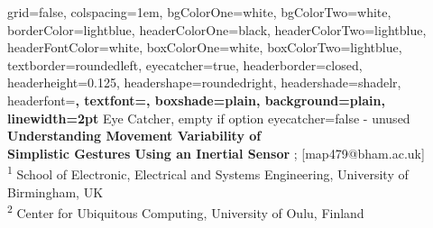 \documentclass[a0paper,portrait]{baposter}
\begin{document}







\begin{poster}%
  {
  grid=false,
  colspacing=1em,
  bgColorOne=white,
  bgColorTwo=white,
  borderColor=lightblue,
  headerColorOne=black,
  headerColorTwo=lightblue,
  headerFontColor=white,
  boxColorOne=white,
  boxColorTwo=lightblue,
  textborder=roundedleft,
  eyecatcher=true,
  headerborder=closed,
  headerheight=0.125\textheight,
  headershape=roundedright,
  headershade=shadelr,
  headerfont=\Large\bf\textsc, %
  textfont={\setlength{\parindent}{1.5em}},
  boxshade=plain,
  background=plain,
  linewidth=2pt
  }
{
	Eye Catcher, empty if option eyecatcher=false - unused
}
{\bf
  {Understanding Movement Variability of \\ Simplistic Gestures Using an Inertial Sensor}
}
{
	{; [map479@bham.ac.uk]  } \\ 
	{\smaller
	\textsuperscript{1} School of Electronic, Electrical and Systems Engineering, University of Birmingham, UK \\
	\textsuperscript{2} Center for Ubiquitous Computing, University of Oulu, Finland }
}
  {%
  	\fbox{
    \begin{minipage}{11em}
    

\end{minipage}}}
\end{poster}
\end{document}
